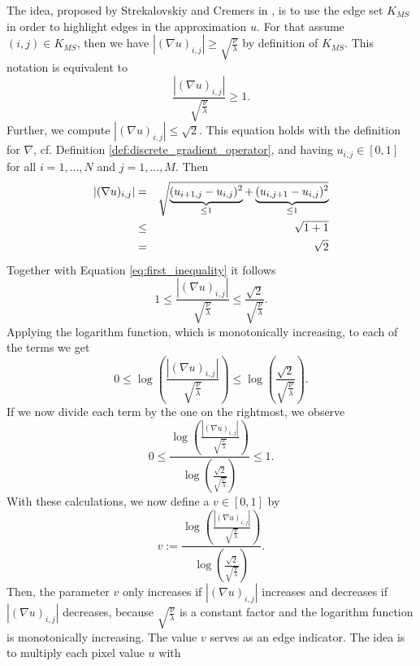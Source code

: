 \documentclass[abstracton]{scrreprt}
\begin{document}
            The idea, proposed by Strekalovskiy and Cremers in \cite{Strekalovskiy-Cremers-eccv14}, is to use the edge set $K_{MS}$ in order to highlight edges in the approximation $u$. For that assume $(i,j) \in K_{MS}$, then we have $|(\nabla u)_{i,j}| \ge \sqrt{\frac{\nu}{\lambda}}$ by definition of $K_{MS}$. This notation is equivalent to
                \begin{equation}
                    \frac{|(\nabla u)_{i,j}|}{\sqrt{\frac{\nu}{\lambda}}} \ge 1.
                    \label{eq:first_inequality}
                \end{equation}
            Further, we compute $|(\nabla u)_{i,j}| \le \sqrt{2}$. This equation holds with the definition for $\nabla$, cf. Definition \ref{def:discrete_gradient_operator}, and having $u_{i,j} \in [0, 1]$ for all $i = 1, ..., N$ and $j = 1, ..., M$. Then
                \begin{eqnarray}
                    |(\nabla u)_{i,j}| &=& \sqrt{\underbrace{(u_{i+1,j} - u_{i,j})^{2}}_{\le 1} + \underbrace{(u_{i,j+1} - u_{i,j})^{2}}_{\le 1}} \notag \\
                    &\le& \sqrt{1 + 1} \notag \\
                    &=& \sqrt{2} \notag
                \end{eqnarray}
            Together with Equation \ref{eq:first_inequality} it follows
                $$
                    1 \le \frac{|(\nabla u)_{i,j}|}{\sqrt{\frac{\nu}{\lambda}}} \le \frac{\sqrt{2}}{\sqrt{\frac{\nu}{\lambda}}}.
                $$
            Applying the logarithm function, which is monotonically increasing, to each of the terms we get
                $$
                    0 \le \log \left( \frac{|(\nabla u)_{i,j}|}{\sqrt{\frac{\nu}{\lambda}}} \right) \le \log \left( \frac{\sqrt{2}}{\sqrt{\frac{\nu}{\lambda}}} \right).
                $$
            If we now divide each term by the one on the rightmost, we observe
                $$
                    0 \le \frac{\log \left( \frac{|(\nabla u)_{i,j}|}{\sqrt{\frac{\nu}{\lambda}}} \right)}{\log \left( \frac{\sqrt{2}}{\sqrt{\frac{\nu}{\lambda}}} \right)} \le 1.
                $$
            With these calculations, we now define a $v \in [0, 1]$ by
                $$
                    v := \frac{\log \left( \frac{|(\nabla u)_{i,j}|}{\sqrt{\frac{\nu}{\lambda}}} \right)}{\log \left( \frac{\sqrt{2}}{\sqrt{\frac{\nu}{\lambda}}} \right)}.
                $$
            Then, the parameter $v$ only increases if $|(\nabla u)_{i,j}|$ increases and decreases if $|(\nabla u)_{i,j}|$ decreases, because $\sqrt{\frac{\nu}{\lambda}}$ is a constant factor and the logarithm function is monotonically increasing. The value $v$ serves as an edge indicator. The idea is to multiply each pixel value $u$ with
\end{document}
